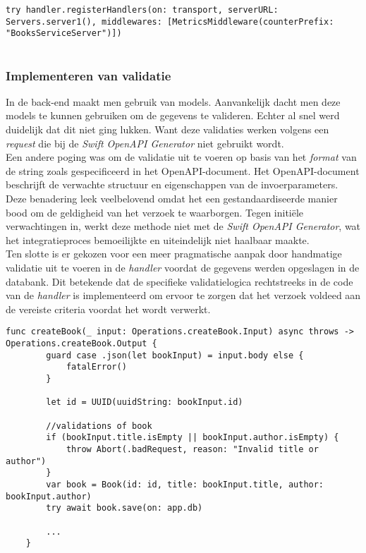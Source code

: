 \begin{lstlisting}[caption=booksServiceServer file]
try handler.registerHandlers(on: transport, serverURL: Servers.server1(), middlewares: [MetricsMiddleware(counterPrefix: "BooksServiceServer")])


\end{lstlisting}

\subsubsection{Implementeren van validatie}
In de back-end maakt men gebruik van models. Aanvankelijk dacht men deze models te kunnen gebruiken om de gegevens te valideren. Echter al snel werd duidelijk dat dit niet ging lukken. Want deze validaties werken volgens een \textit{request} die bij de \textit{Swift OpenAPI Generator} niet gebruikt wordt. 
 \\
Een andere poging was om de validatie uit te voeren op basis van het \textit{format} van de string zoals gespecificeerd in het OpenAPI-document. Het OpenAPI-document beschrijft de verwachte structuur en eigenschappen van de invoerparameters. Deze benadering leek veelbelovend omdat het een gestandaardiseerde manier bood om de geldigheid van het verzoek te waarborgen. Tegen initiële verwachtingen in, werkt deze methode niet met de \textit{Swift OpenAPI Generator}, wat het integratieproces bemoeilijkte en uiteindelijk niet haalbaar maakte.
 \\
Ten slotte is er  gekozen voor een meer pragmatische aanpak door handmatige validatie uit te voeren in de \textit{handler} voordat de gegevens werden opgeslagen in de databank. Dit betekende dat de specifieke validatielogica rechtstreeks in de code van de \textit{handler} is implementeerd om ervoor te zorgen dat het verzoek voldeed aan de vereiste criteria voordat het wordt verwerkt. 
\begin{lstlisting}[caption=handler file]
    func createBook(_ input: Operations.createBook.Input) async throws -> Operations.createBook.Output {
        guard case .json(let bookInput) = input.body else {
            fatalError()
        }
        
        let id = UUID(uuidString: bookInput.id)
        
        //validations of book
        if (bookInput.title.isEmpty || bookInput.author.isEmpty) {
            throw Abort(.badRequest, reason: "Invalid title or author")
        }
        var book = Book(id: id, title: bookInput.title, author: bookInput.author)
        try await book.save(on: app.db)
        
        ...
    }
\end{lstlisting}


